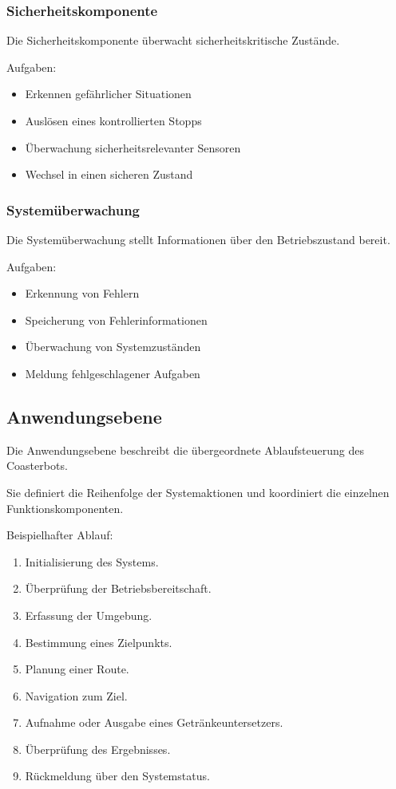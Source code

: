 \subsubsection{Sicherheitskomponente}\label{sicherheitskomponente}

Die Sicherheitskomponente überwacht sicherheitskritische Zustände.

Aufgaben:

\begin{itemize}
\tightlist
\item
  Erkennen gefährlicher Situationen
\item
  Auslösen eines kontrollierten Stopps
\item
  Überwachung sicherheitsrelevanter Sensoren
\item
  Wechsel in einen sicheren Zustand
\end{itemize}

\subsubsection{Systemüberwachung}\label{systemuxfcberwachung}

Die Systemüberwachung stellt Informationen über den Betriebszustand
bereit.

Aufgaben:

\begin{itemize}
\tightlist
\item
  Erkennung von Fehlern
\item
  Speicherung von Fehlerinformationen
\item
  Überwachung von Systemzuständen
\item
  Meldung fehlgeschlagener Aufgaben
\end{itemize}

\subsection{Anwendungsebene}\label{anwendungsebene}

Die Anwendungsebene beschreibt die übergeordnete Ablaufsteuerung des
Coasterbots.

Sie definiert die Reihenfolge der Systemaktionen und koordiniert die
einzelnen Funktionskomponenten.

Beispielhafter Ablauf:

\begin{enumerate}
\def\labelenumi{\arabic{enumi}.}
\tightlist
\item
  Initialisierung des Systems.
\item
  Überprüfung der Betriebsbereitschaft.
\item
  Erfassung der Umgebung.
\item
  Bestimmung eines Zielpunkts.
\item
  Planung einer Route.
\item
  Navigation zum Ziel.
\item
  Aufnahme oder Ausgabe eines Getränkeuntersetzers.
\item
  Überprüfung des Ergebnisses.
\item
  Rückmeldung über den Systemstatus.
\end{enumerate}

